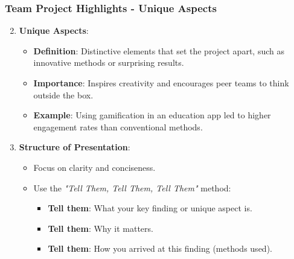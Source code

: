 \documentclass{beamer}
\begin{document}
\begin{frame}[fragile]
    \frametitle{Team Project Highlights - Unique Aspects}
    \begin{enumerate}
        \setcounter{enumi}{1} %
        \item \textbf{Unique Aspects}:
            \begin{itemize}
                \item \textbf{Definition}: Distinctive elements that set the project apart, such as innovative methods or surprising results.
                \item \textbf{Importance}: Inspires creativity and encourages peer teams to think outside the box.
                \item \textbf{Example}: Using gamification in an education app led to higher engagement rates than conventional methods.
            \end{itemize}

        \item \textbf{Structure of Presentation}:
            \begin{itemize}
                \item Focus on clarity and conciseness.
                \item Use the \textit{"Tell Them, Tell Them, Tell Them"} method:
                    \begin{itemize}
                        \item \textbf{Tell them}: What your key finding or unique aspect is.
                        \item \textbf{Tell them}: Why it matters.
                        \item \textbf{Tell them}: How you arrived at this finding (methods used).
                    \end{itemize}
            \end{itemize}
    \end{enumerate}
\end{frame}
\end{document}
